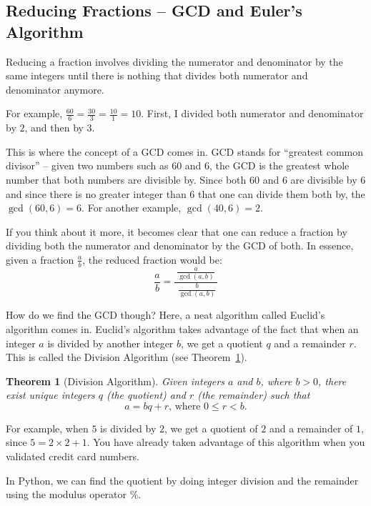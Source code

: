 \documentclass[11pt]{cselabheader}
\theoremstyle{plain}
\newtheorem{thm}{Theorem}
\begin{document}
\begin{appendices}
  \section{Reducing Fractions -- GCD and Euler's Algorithm}
  \label{sec:gcd}

  Reducing a fraction involves dividing the numerator and denominator by
  the same integers until there is nothing that divides both numerator and
  denominator anymore.

  For example, $\frac{60}{6} = \frac{30}{3} = \frac{10}{1} = 10$. First, I
  divided both numerator and denominator by $2$, and then by $3$. 

  This is where the concept of a GCD comes in. GCD stands for ``greatest
  common divisor'' -- given two numbers such as $60$ and $6$, the GCD is the
  greatest whole number that both numbers are divisible by. Since both $60$ 
  and $6$ are divisible by $6$ and since there is no greater integer than $6$
  that one can divide them both by, the $\gcd(60, 6) = 6$. For another
  example, $\gcd(40, 6) = 2$.

  If you think about it more, it becomes clear that one can reduce a fraction
  by dividing both the numerator and denominator by the GCD of both. In
  essence, given a fraction $\frac{a}{b}$, the reduced fraction would be:
  \[
    \frac{a}{b} = \frac{~\frac{a}{\gcd(a, b)}~}{~\frac{b}{\gcd(a, b)}}
  \]

  How do we find the GCD though? Here, a neat algorithm called Euclid's
  algorithm comes in. Euclid's algorithm takes advantage of the fact that
  when an integer $a$ is divided by another integer $b$, we get a quotient
  $q$ and a remainder $r$. This is called the Division Algorithm (see
  Theorem~\ref{thm:div}). 

  \begin{thm}[Division Algorithm] \label{thm:div}
    Given integers $a$ and $b$, where $b > 0$, there exist unique integers
    $q$ (the quotient) and $r$ (the remainder) such that 
    \[ a = bq + r\text{, where }0 \leq r < b. \]
  \end{thm}

  For example, when $5$ is divided by $2$, we get a quotient of $2$ and a
  remainder of $1$, since $5 = 2 \times 2 + 1$. You have already taken 
  advantage of this algorithm when you validated credit card numbers. 

  In Python, we can find the quotient by doing integer division and the remainder
  using the modulus operator \%.


\end{appendices}
\end{document}
